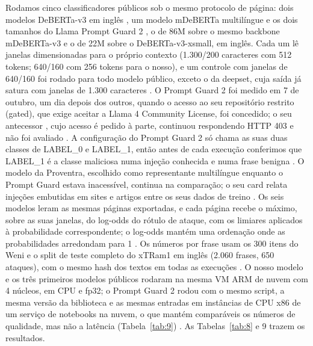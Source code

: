 \documentclass[11pt]{article}
\begin{document}
Rodamos cinco classificadores públicos sob o mesmo protocolo de página: dois modelos DeBERTa-v3 em inglês \citep{protectai2024deberta, deepset2023deberta}, um modelo mDeBERTa multilíngue \citep{proventra2025mdeberta} e os dois tamanhos do Llama Prompt Guard 2 \citep{meta2025promptguard2}, o de 86M sobre o mesmo backbone mDeBERTa-v3 e o de 22M sobre o DeBERTa-v3-xsmall, em inglês. Cada um lê janelas dimensionadas para o próprio contexto (1.300/200 caracteres com 512 tokens; 640/160 com 256 tokens para o nosso), e um controle com janelas de 640/160 foi rodado para todo modelo público, exceto o da deepset, cuja saída já satura com janelas de 1.300 caracteres%
. O Prompt Guard 2 foi medido em 7 de outubro, um dia depois dos outros, quando o acesso ao seu repositório restrito (gated), que exige aceitar a Llama 4 Community License, foi concedido; o seu antecessor \citep{meta2024promptguard}, cujo acesso é pedido à parte, continuou respondendo HTTP 403 e não foi avaliado%
. A configuração do Prompt Guard 2 só chama as suas duas classes de LABEL\_0 e LABEL\_1, então antes de cada execução conferimos que LABEL\_1 é a classe maliciosa numa injeção conhecida e numa frase benigna%
. O modelo da Proventra, escolhido como representante multilíngue enquanto o Prompt Guard estava inacessível, continua na comparação; o seu card relata injeções embutidas em sites e artigos entre os seus dados de treino%
. Os seis modelos leram as mesmas páginas exportadas, e cada página recebe o máximo, sobre as suas janelas, do log-odds do rótulo de ataque, com os limiares aplicados à probabilidade correspondente; o log-odds mantém uma ordenação onde as probabilidades arredondam para 1%
. Os números por frase usam os 300 itens do Weni e o split de teste completo do xTRam1 em inglês (2.060 frases, 650 ataques), com o mesmo hash dos textos em todas as execuções%
. O nosso modelo e os três primeiros modelos públicos rodaram na mesma VM ARM de nuvem com 4 núcleos, em CPU e fp32; o Prompt Guard 2 rodou com o mesmo script, a mesma versão da biblioteca e as mesmas entradas em instâncias de CPU x86 de um serviço de notebooks na nuvem, o que mantém comparáveis os números de qualidade, mas não a latência (Tabela~\ref{tab:9})%
. As Tabelas~\ref{tab:8} e 9 trazem os resultados.
\end{document}
